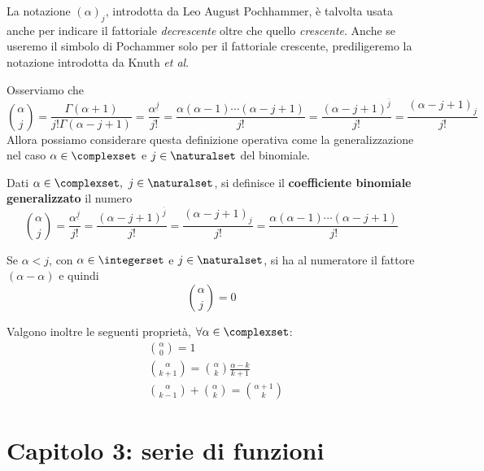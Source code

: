 \begin{attention}
		La notazione $\left(\alpha\right)_j$, introdotta da Leo August Pochhammer, è talvolta usata anche per indicare il fattoriale \textit{decrescente} oltre che quello \textit{crescente}. Anche se useremo il simbolo di Pochammer solo per il fattoriale crescente, prediligeremo la notazione introdotta da Knuth \textit{et al}.
\end{attention}
Osserviamo che
\begin{equation*}
	\binom{\alpha}{j}=\frac{\Gamma\left(\alpha+1\right)}{j!\Gamma\left(\alpha-j+1\right)}=\frac{\alpha^{\underline{j}}}{j!}=\frac{\alpha\left(\alpha-1\right)\cdots\left(\alpha-j+1\right)}{j!}=\frac{\left(\alpha-j+1\right)^{\overline{j}}}{j!}=\frac{\left(\alpha-j+1\right)_j}{j!}
\end{equation*}
Allora possiamo considerare questa definizione operativa come la generalizzazione nel caso $\alpha\in\complexset$ e $j\in\naturalset$ del binomiale.
\begin{define}
	Dati $\alpha\in\complexset,\ j\in\naturalset$, si definisce il \textbf{coefficiente binomiale generalizzato} il numero
	\begin{equation}
		\binom{\alpha}{j}=\frac{\alpha^{\underline{j}}}{j!}=\frac{\left(\alpha-j+1\right)^{\overline{j}}}{j!}=\frac{\left(\alpha-j+1\right)_j}{j!}=\frac{\alpha\left(\alpha-1\right)\cdots\left(\alpha-j+1\right)}{j!}
	\end{equation}
\end{define}
\begin{observe}
	Se $\alpha<j$, con $\alpha\in\integerset$ e $j\in\naturalset$, si ha al numeratore il fattore $\left(\alpha-\alpha\right)$ e quindi
	\begin{equation*}
		\binom{\alpha}{j}=0
	\end{equation*}
\end{observe}
Valgono inoltre le seguenti proprietà, $\forall \alpha\in\complexset$:
\begin{align}
	&\binom{\alpha}{0}=1\\
	&\binom{\alpha}{k+1}=\binom{\alpha}{k}\frac{\alpha-k}{k+1}\\
	&\binom{\alpha}{k-1}+\binom{\alpha}{k}=\binom{\alpha+1}{k}
\end{align}
\section{Capitolo 3: serie di funzioni}
